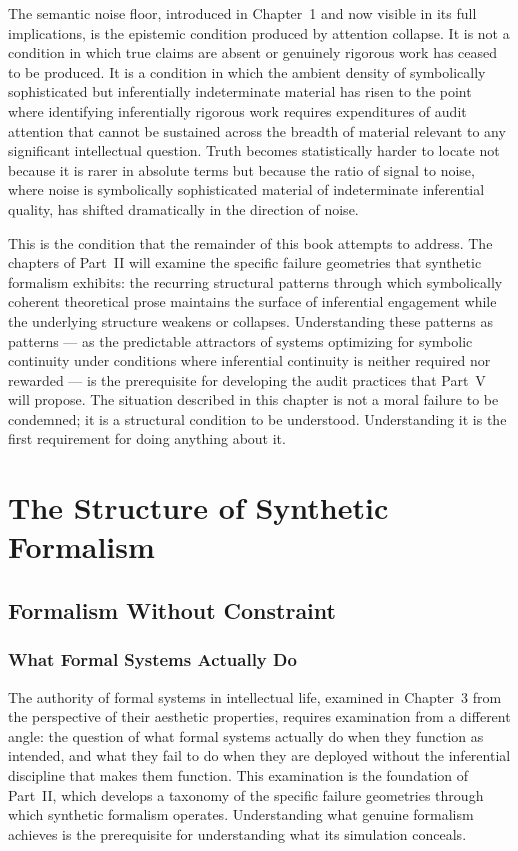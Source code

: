 \documentclass[12pt, openright, twoside]{book}
\begin{document}
The semantic noise floor, introduced in Chapter~1 and now
visible in its full implications, is the epistemic condition
produced by attention collapse. It is not a condition in which
true claims are absent or genuinely rigorous work has ceased
to be produced. It is a condition in which the ambient density
of symbolically sophisticated but inferentially indeterminate
material has risen to the point where identifying inferentially
rigorous work requires expenditures of audit attention that cannot
be sustained across the breadth of material relevant to any
significant intellectual question. Truth becomes statistically
harder to locate not because it is rarer in absolute terms
but because the ratio of signal to noise, where noise is
symbolically sophisticated material of indeterminate inferential
quality, has shifted dramatically in the direction of noise.

This is the condition that the remainder of this book attempts
to address. The chapters of Part~II will examine the specific
failure geometries that synthetic formalism exhibits: the recurring
structural patterns through which symbolically coherent theoretical
prose maintains the surface of inferential engagement while the
underlying structure weakens or collapses. Understanding these
patterns as patterns --- as the predictable attractors of systems
optimizing for symbolic continuity under conditions where inferential
continuity is neither required nor rewarded --- is the prerequisite
for developing the audit practices that Part~V will propose. The
situation described in this chapter is not a moral failure to be
condemned; it is a structural condition to be understood. Understanding
it is the first requirement for doing anything about it.

\clearpage

\part{The Structure of Synthetic Formalism}

\chapter{Formalism Without Constraint}

\section{What Formal Systems Actually Do}

The authority of formal systems in intellectual life, examined in
Chapter~3 from the perspective of their aesthetic properties, requires
examination from a different angle: the question of what formal systems
actually do when they function as intended, and what they fail to do
when they are deployed without the inferential discipline that makes
them function. This examination is the foundation of Part~II, which
develops a taxonomy of the specific failure geometries through which
synthetic formalism operates. Understanding what genuine formalism
achieves is the prerequisite for understanding what its simulation
conceals.
\end{document}
